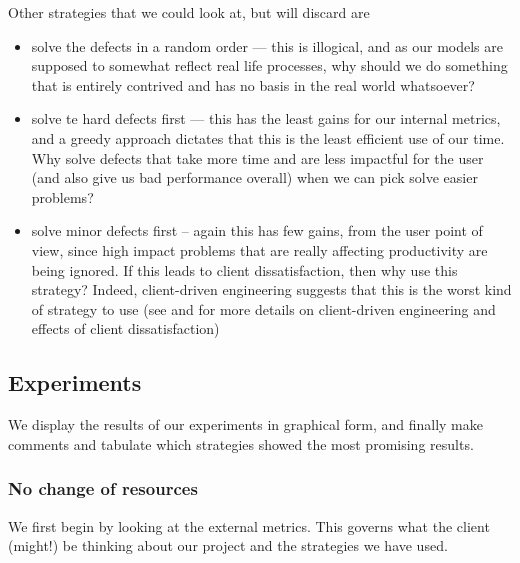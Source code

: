 Other strategies that we could look at, but will discard are
\begin{itemize}
	\item solve the defects in a random order --- this is illogical, and as our models are supposed to
somewhat reflect real life processes, why should we do something that is entirely contrived and has
no basis in the real world whatsoever?
	\item solve te hard defects first --- this has the least gains for our internal metrics, and a greedy approach dictates
that this is the least efficient use of our time.
	Why solve defects that take more time and are less impactful for the user (and also give us bad
performance overall) when we can pick solve easier problems?
	\item solve minor defects first -- again this has few gains, from the user point of view, since
high impact problems that are really affecting productivity are being ignored.
	If this leads to client dissatisfaction, then why use this strategy?
	Indeed, client-driven engineering suggests that this is the worst kind of strategy to use (see
\FIXME and \FIXME for more details on client-driven engineering and effects of client
dissatisfaction)
\end{itemize}

\subsection{Experiments}

We display the results of our experiments in graphical form, and finally make comments and tabulate
which strategies showed the most promising results.

\subsubsection{No change of resources}

We first begin by looking at the external metrics.
This governs what the client (might!) be thinking about our project and the strategies we have used.

